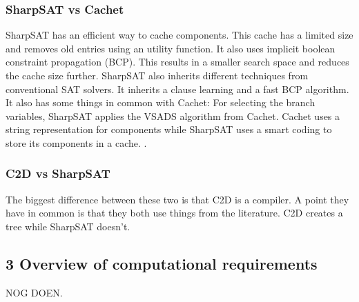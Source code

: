 \documentclass[a4paper,10pt]{report}
\begin{document}
\subsubsection*{SharpSAT vs Cachet}
SharpSAT has an efficient way to cache components. This cache has a limited size and removes old entries using an utility function.
It also uses implicit boolean constraint propagation (BCP). This results in a smaller search space and reduces the cache size further.
SharpSAT also inherits different techniques from conventional SAT solvers. It inherits a clause learning and a fast BCP algorithm. It also has some things in common with Cachet: For selecting the branch variables, SharpSAT applies the VSADS algorithm from Cachet.
Cachet uses a string representation for components while SharpSAT uses a smart coding to store its components in a cache. \cite{SharpSAT}.

\subsubsection*{C2D vs SharpSAT}
The biggest difference between these two is that C2D is a compiler. A point they have in common is that they both use things from the literature. C2D creates a tree while SharpSAT doesn't.

\subsection*{3 Overview of computational requirements}
NOG DOEN.



\end{document}
